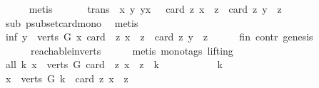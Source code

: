 \begin{isabellebody}
\ \ \ \ \isamarkupfalse%
\ metis\ \isanewline
\ \ \isamarkupfalse%
\ \isamarkupfalse%
\ trans{\isacharcolon}{\kern0pt}\ {\isachardoublequoteopen}{\isasymforall}\ x\ y{\isachardot}{\kern0pt}\ y{\isasymrightarrow}\isactrlsup {\isacharplus}{\kern0pt}x\ {\isasymlongrightarrow}\ \ card\ {\isacharbraceleft}{\kern0pt}z{\isachardot}{\kern0pt}\ x\ {\isasymrightarrow}\isactrlsup {\isacharplus}{\kern0pt}\ z{\isacharbraceright}{\kern0pt}\ {\isacharless}{\kern0pt}\ card\ {\isacharbraceleft}{\kern0pt}z{\isachardot}{\kern0pt}\ y\ {\isasymrightarrow}\isactrlsup {\isacharplus}{\kern0pt}\ z{\isacharbraceright}{\kern0pt}{\isachardoublequoteclose}\isanewline
\ \ \ \ \isamarkupfalse%
\ sub\ psubset{\isacharunderscore}{\kern0pt}card{\isacharunderscore}{\kern0pt}mono\ \isamarkupfalse%
\ metis\isanewline
\ \ \isamarkupfalse%
\ \isamarkupfalse%
\ inf{\isacharcolon}{\kern0pt}\ {\isachardoublequoteopen}{\isasymforall}y\ {\isasymin}\ verts\ G{\isachardot}{\kern0pt}\ {\isasymexists}x{\isachardot}{\kern0pt}\ card\ \ {\isacharbraceleft}{\kern0pt}z{\isachardot}{\kern0pt}\ x\ {\isasymrightarrow}\isactrlsup {\isacharplus}{\kern0pt}\ z{\isacharbraceright}{\kern0pt}\ {\isachargreater}{\kern0pt}\ card\ {\isacharbraceleft}{\kern0pt}z{\isachardot}{\kern0pt}\ y\ {\isasymrightarrow}\isactrlsup {\isacharplus}{\kern0pt}\ z{\isacharbraceright}{\kern0pt}{\isachardoublequoteclose}\isanewline
\ \ \ \ \isamarkupfalse%
\ fin\ contr\ genesis\ \isanewline
\ \ \ \ \ \ reachable{}{\isacharunderscore}{\kern0pt}in{\isacharunderscore}{\kern0pt}verts{\isacharparenleft}{\kern0pt}{}{\isacharparenright}{\kern0pt}\isanewline
\ \ \ \ \isamarkupfalse%
\ {\isacharparenleft}{\kern0pt}metis\ {\isacharparenleft}{\kern0pt}mono{\isacharunderscore}{\kern0pt}tags{\isacharcomma}{\kern0pt}\ lifting{\isacharparenright}{\kern0pt}{\isacharparenright}{\kern0pt}\ \isanewline
\ \ \isamarkupfalse%
\ all{\isacharcolon}{\kern0pt}\ {\isachardoublequoteopen}{\isasymforall}k{\isachardot}{\kern0pt}\ {\isasymexists}x\ {\isasymin}\ verts\ G{\isachardot}{\kern0pt}\ card\ \ {\isacharbraceleft}{\kern0pt}z{\isachardot}{\kern0pt}\ x\ {\isasymrightarrow}\isactrlsup {\isacharplus}{\kern0pt}\ z{\isacharbraceright}{\kern0pt}\ {\isachargreater}{\kern0pt}\ k{\isachardoublequoteclose}\ \isanewline
\ \ \isamarkupfalse%
\ \isanewline
\ \ \ \ \isamarkupfalse%
\ k\ \isanewline
\ \ \ \ \isamarkupfalse%
\ {\isachardoublequoteopen}{\isasymexists}x\ {\isasymin}\ verts\ G{\isachardot}{\kern0pt}\ k\ {\isacharless}{\kern0pt}\ card\ {\isacharbraceleft}{\kern0pt}z{\isachardot}{\kern0pt}\ x\ {\isasymrightarrow}\isactrlsup {\isacharplus}{\kern0pt}\ z{\isacharbraceright}{\kern0pt}{\isachardoublequoteclose}\isanewline

\end{isabellebody}
